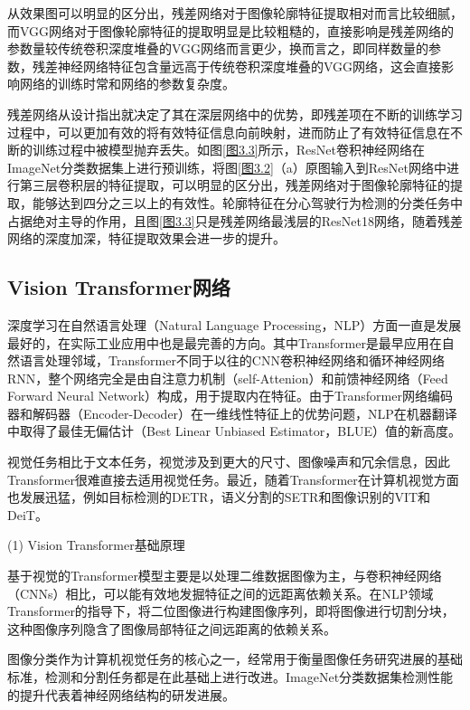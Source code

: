 从效果图可以明显的区分出，残差网络对于图像轮廓特征提取相对而言比较细腻，而VGG网络对于图像轮廓特征的提取明显是比较粗糙的，直接影响是残差网络的参数量较传统卷积深度堆叠的VGG网络而言更少，换而言之，即同样数量的参数，残差神经网络特征包含量远高于传统卷积深度堆叠的VGG网络，这会直接影响网络的训练时常和网络的参数复杂度。


残差网络从设计指出就决定了其在深层网络中的优势，即残差项在不断的训练学习过程中，可以更加有效的将有效特征信息向前映射，进而防止了有效特征信息在不断的训练过程中被模型抛弃丢失。如图\ref{图3.3}所示，ResNet卷积神经网络在ImageNet分类数据集上进行预训练，将图\ref{图3.2}（a）原图输入到ResNet网络中进行第三层卷积层的特征提取，可以明显的区分出，残差网络对于图像轮廓特征的提取，能够达到四分之三以上的有效性。轮廓特征在分心驾驶行为检测的分类任务中占据绝对主导的作用，且图\ref{图3.3}只是残差网络最浅层的ResNet18网络，随着残差网络的深度加深，特征提取效果会进一步的提升。

\subsection{Vision Transformer网络}

深度学习在自然语言处理（Natural Language Processing，NLP）方面一直是发展最好的，在实际工业应用中也是最完善的方向。其中Transformer是最早应用在自然语言处理邻域\cite{51}，Transformer不同于以往的CNN卷积神经网络和循环神经网络RNN，整个网络完全是由自注意力机制（self-Attenion）和前馈神经网络（Feed Forward Neural Network）构成，用于提取内在特征。由于Transformer网络编码器和解码器（Encoder-Decoder）在一维线性特征上的优势问题，NLP在机器翻译中取得了最佳无偏估计（Best Linear Unbiased Estimator，BLUE）值的新高度。

视觉任务相比于文本任务，视觉涉及到更大的尺寸、图像噪声和冗余信息，因此Transformer很难直接去适用视觉任务。最近，随着Transformer在计算机视觉方面也发展迅猛，例如目标检测的DETR\cite{52}，语义分割的SETR\cite{54}和图像识别的VIT\cite{53}和DeiT\cite{55}。

(1)	Vision Transformer基础原理

基于视觉的Transformer模型主要是以处理二维数据图像为主，与卷积神经网络（CNNs）相比，可以能有效地发掘特征之间的远距离依赖关系。在NLP领域Transformer的指导下，将二位图像进行构建图像序列，即将图像进行切割分块，这种图像序列隐含了图像局部特征之间远距离的依赖关系。

图像分类作为计算机视觉任务的核心之一，经常用于衡量图像任务研究进展的基础标准，检测和分割任务都是在此基础上进行改进。ImageNet分类数据集检测性能的提升代表着神经网络结构的研发进展。

